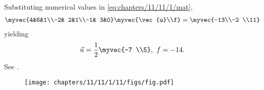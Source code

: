 Substituting numerical values in 
	\eqref{eq:chapters/11/11/1/mat},
\begin{align}
	\label{eq:vertex_system}
	\myvec{4&6&1\\-2& 2&1\\-1& 3&0}\myvec{\vec{u}\\f} = \myvec{-13\\-2 \\11}
\end{align}
yielding
\begin{align}
	\vec{u}=\frac{1}{2}\myvec{-7 \\5},\
f=-14.
\end{align}
See 
		.
	\begin{figure}[H]
		\centering
 \texttt{[image: chapters/11/11/1/11/figs/fig.pdf]}
		\caption{}
		\label{fig:11/11/1/11}
  	\end{figure}
